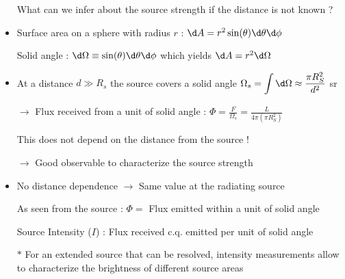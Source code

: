 \Tr
\onecolumn
\begin{itemize}
\item[] \begin{center} {\red What can we infer about the source strength if the distance is not known ?} \end{center}
\item Surface area on a sphere with radius $r$ : $\d A=r^{2} \sin(\theta) \d\theta \d\phi$
\item[] {\blue Solid angle : $\d\Omega \equiv \sin(\theta)\d\theta \d\phi$} which yields {\blue $\d A=r^{2}\d\Omega$}
\item At a distance $d \gg R_{s}$ the source covers a solid angle
      $\displaystyle \Omega_{s}=\int \d\Omega \approx \frac{\pi R_{S}^{2}}{d^{2}}$ sr
\item[] $\rightarrow$ Flux received from a unit of solid angle :
        $\displaystyle \Phi=\frac{F}{\Omega_{s}}=\frac{L}{4\pi (\pi R_{S}^{2})}$
\item[] {\red This does not depend on the distance from the source !}
\item[] $\rightarrow$ Good observable to characterize the source strength
\item No distance dependence $\rightarrow$ Same value at the radiating source
\item[] As seen from the source : $\Phi=$ Flux emitted within a unit of solid angle
\item[] \begin{center} {\blue Source Intensity ($I$) : Flux received c.q. emitted per unit of solid angle} \end{center}
\item[$\ast$] For an extended source that can be resolved, intensity measurements allow to characterize
                     the brightness of different source areas
\end{itemize}

